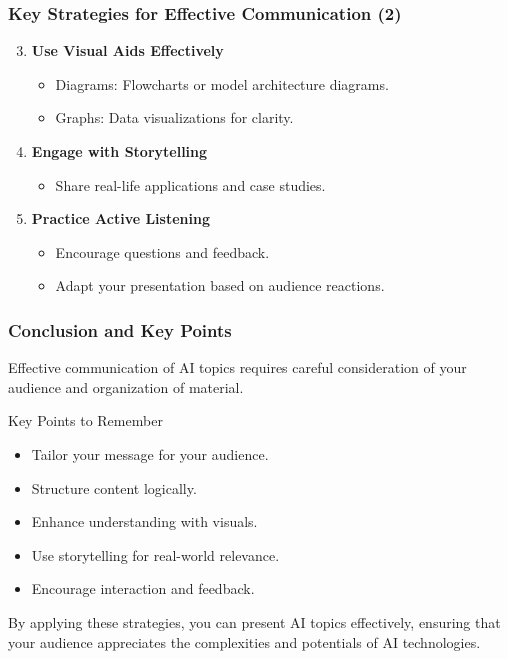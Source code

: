 \documentclass[aspectratio=169]{beamer}
\begin{document}
\begin{frame}[fragile]
    \frametitle{Key Strategies for Effective Communication (2)}
    \begin{enumerate}
        \setcounter{enumi}{2} %
        \item \textbf{Use Visual Aids Effectively}
        \begin{itemize}
            \item Diagrams: Flowcharts or model architecture diagrams.
            \item Graphs: Data visualizations for clarity.
        \end{itemize}
        
        \item \textbf{Engage with Storytelling}
        \begin{itemize}
            \item Share real-life applications and case studies.
        \end{itemize}

        \item \textbf{Practice Active Listening}
        \begin{itemize}
            \item Encourage questions and feedback.
            \item Adapt your presentation based on audience reactions.
        \end{itemize}
    \end{enumerate}
\end{frame}

\begin{frame}[fragile]
    \frametitle{Conclusion and Key Points}
    Effective communication of AI topics requires careful consideration of your audience and organization of material.
    
    \begin{block}{Key Points to Remember}
        \begin{itemize}
            \item Tailor your message for your audience.
            \item Structure content logically.
            \item Enhance understanding with visuals.
            \item Use storytelling for real-world relevance.
            \item Encourage interaction and feedback.
        \end{itemize}
    \end{block}
    
    By applying these strategies, you can present AI topics effectively, ensuring that your audience appreciates the complexities and potentials of AI technologies.
\end{frame}
\end{document}
